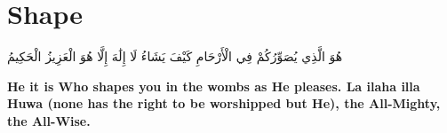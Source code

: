 \chapter{Shape}
\begin{center}
    {\Huge    
        \begin{Arabic}
            هُوَ الَّذِي يُصَوِّرُكُمْ فِي الْأَرْحَامِ كَيْفَ يَشَاءُ لَا إِلَٰهَ إِلَّا هُوَ الْعَزِيزُ الْحَكِيمُ
        \end{Arabic}
    }    
\end{center}
\vspace*{\fill}
\vspace{3cm}
\begin{center}
    \large \textbf{He it is Who shapes you in the wombs as He pleases. La ilaha illa Huwa (none has the right to be worshipped but He), the All-Mighty, the All-Wise.}
\end{center}
